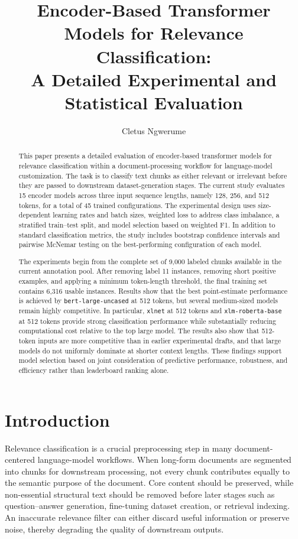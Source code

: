 \documentclass[11pt]{article}
\title{Encoder-Based Transformer Models for Relevance Classification:\\
A Detailed Experimental and Statistical Evaluation}
\author{Cletus Ngwerume}
\date{}
\begin{document}
\maketitle

\begin{abstract}
This paper presents a detailed evaluation of encoder-based transformer models for relevance classification within a document-processing workflow for language-model customization. The task is to classify text chunks as either relevant or irrelevant before they are passed to downstream dataset-generation stages. The current study evaluates 15 encoder models across three input sequence lengths, namely 128, 256, and 512 tokens, for a total of 45 trained configurations. The experimental design uses size-dependent learning rates and batch sizes, weighted loss to address class imbalance, a stratified train--test split, and model selection based on weighted F1. In addition to standard classification metrics, the study includes bootstrap confidence intervals and pairwise McNemar testing on the best-performing configuration of each model.

The experiments begin from the complete set of 9{,}000 labeled chunks available in the current annotation pool. After removing label 11 instances, removing short positive examples, and applying a minimum token-length threshold, the final training set contains 6{,}316 usable instances. Results show that the best point-estimate performance is achieved by \texttt{bert-large-uncased} at 512 tokens, but several medium-sized models remain highly competitive. In particular, \texttt{xlnet} at 512 tokens and \texttt{xlm-roberta-base} at 512 tokens provide strong classification performance while substantially reducing computational cost relative to the top large model. The results also show that 512-token inputs are more competitive than in earlier experimental drafts, and that large models do not uniformly dominate at shorter context lengths. These findings support model selection based on joint consideration of predictive performance, robustness, and efficiency rather than leaderboard ranking alone.
\end{abstract}

\section{Introduction}

Relevance classification is a crucial preprocessing step in many document-centered language-model workflows. When long-form documents are segmented into chunks for downstream processing, not every chunk contributes equally to the semantic purpose of the document. Core content should be preserved, while non-essential structural text should be removed before later stages such as question--answer generation, fine-tuning dataset creation, or retrieval indexing. An inaccurate relevance filter can either discard useful information or preserve noise, thereby degrading the quality of downstream outputs.
\end{document}
